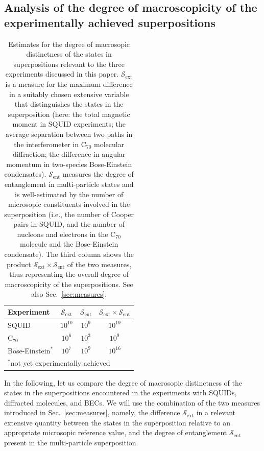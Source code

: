 \documentclass[twocolumn,aps,floatfix,amsmath,amssymb,showpacs,nofootinbib]{revtex4}
\begin{document}
\subsection{Analysis of the degree of
  macroscopicity of the experimentally achieved superpositions} \label{sec:scaling}

\begin{table}
\begin{center}
\begin{tabular}{lccc}
Experiment & $\mathcal{S}_\text{ext}$ & $\mathcal{S}_\text{ent}$ &
$\mathcal{S}_\text{ext} \times \mathcal{S}_\text{ent}$ \\ \hline
SQUID & $10^{10}$ & $10^9$ & $10^{19}$ \\
C$_{70}$ &  $10^6$ & $10^3$ & $10^9$ \\
Bose-Einstein$^*$ & $10^7$ & $10^9$ & $10^{16}$ \\ \hline
\multicolumn{4}{l}{$^*$not yet experimentally achieved}
 \\ 
\end{tabular}
\end{center}
\caption[Estimates for the degree of macrosopic
  distinctness of the states in superpositions]{
  Estimates for the degree of macrosopic 
  distinctness of the states in superpositions relevant to the three
  experiments discussed in this paper. $\mathcal{S}_\text{ext}$
  is a measure for the maximum difference in a suitably chosen
  extensive variable that distinguishes the states in the
  superposition (here: the total magnetic moment in SQUID experiments; the
  average separation between two paths in the interferometer in
  C$_{70}$ molecular diffraction; the difference in angular
  momentum in two-species Bose-Einstein
  condensates). $\mathcal{S}_\text{ent}$ measures the degree of
  entanglement in multi-particle states and is well-estimated by the
  number of microsopic constituents involved in the superposition
  (i.e., the  number of Cooper pairs in SQUID, and the number of nucleons and
  electrons in the C$_{70}$ molecule and the Bose-Einstein
  condensate). The third column shows the product
  $\mathcal{S}_\text{ext} \times \mathcal{S}_\text{ent}$ of the two
  measures, thus representing the overall degree of macroscopicity of the
  superpositions. See also Sec.~\ref{sec:measures}.} \label{tab:degrees}
\end{table}

In the following, let us compare the degree of macrosopic distinctness
of the states in the superpositions encountered in the experiments
with SQUIDs, diffracted molecules, and BECs.  We will use the
combination of the two measures introduced in Sec.~\ref{sec:measures},
namely, the difference $\mathcal{S}_\text{ext}$ in a relevant
extensive quantity between the states in the superposition relative to
an appropriate microsopic reference value, and the degree of
entanglement $\mathcal{S}_\text{ent}$ present in the multi-particle
superposition.
\end{document}
